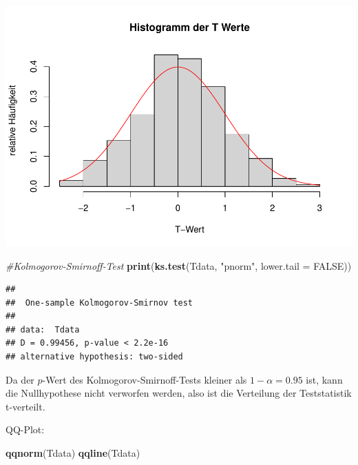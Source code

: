 \documentclass[]{article}
\newenvironment{Shaded}{\begin{snugshade}}{\end{snugshade}}
\newcommand{\CommentTok}[1]{\textcolor[rgb]{0.56,0.35,0.01}{\textit{#1}}}
\newcommand{\DataTypeTok}[1]{\textcolor[rgb]{0.13,0.29,0.53}{#1}}
\newcommand{\KeywordTok}[1]{\textcolor[rgb]{0.13,0.29,0.53}{\textbf{#1}}}
\newcommand{\NormalTok}[1]{#1}
\newcommand{\OtherTok}[1]{\textcolor[rgb]{0.56,0.35,0.01}{#1}}
\newcommand{\StringTok}[1]{\textcolor[rgb]{0.31,0.60,0.02}{#1}}
\begin{document}
\includegraphics{Test_files/figure-latex/unnamed-chunk-9-1.pdf}

\begin{Shaded}
\begin{Highlighting}[]
\CommentTok{#Kolmogorov-Smirnoff-Test}
\KeywordTok{print}\NormalTok{(}\KeywordTok{ks.test}\NormalTok{(Tdata, }\StringTok{"pnorm"}\NormalTok{, }\DataTypeTok{lower.tail =} \OtherTok{FALSE}\NormalTok{))}
\end{Highlighting}
\end{Shaded}

\begin{verbatim}
## 
##  One-sample Kolmogorov-Smirnov test
## 
## data:  Tdata
## D = 0.99456, p-value < 2.2e-16
## alternative hypothesis: two-sided
\end{verbatim}

Da der \(p\)-Wert des Kolmogorov-Smirnoff-Tests kleiner als \(1-\alpha=0.95\) ist, kann die Nullhypothese nicht verworfen werden,
also ist die Verteilung der Teststatistik t-verteilt.

QQ-Plot:

\begin{Shaded}
\begin{Highlighting}[]
\KeywordTok{qqnorm}\NormalTok{(Tdata)}
\KeywordTok{qqline}\NormalTok{(Tdata)}
\end{Highlighting}
\end{Shaded}
\end{document}
